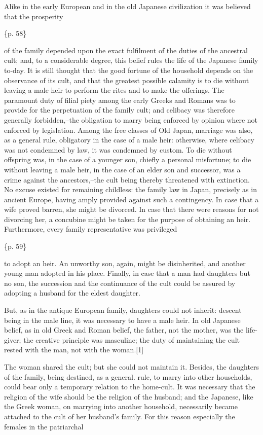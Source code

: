 Alike in the early European and in the old Japanese civilization it was believed that the prosperity

\{p. 58\}

of the family depended upon the exact fulfilment of the duties of the ancestral cult; and, to a considerable degree, this belief rules the life of the Japanese family to-day. It is still thought that the good fortune of the household depends on the observance of its cult, and that the greatest possible calamity is to die without leaving a male heir to perform the rites and to make the offerings. The paramount duty of filial piety among the early Greeks and Romans was to provide for the perpetuation of the family cult; and celibacy was therefore generally forbidden,--the obligation to marry being enforced by opinion where not enforced by legislation. Among the free classes of Old Japan, marriage was also, as a general rule, obligatory in the case of a male heir: otherwise, where celibacy was not condemned by law, it was condemned by custom. To die without offspring was, in the case of a younger son, chiefly a personal misfortune; to die without leaving a male heir, in the case of an elder son and successor, was a crime against the ancestors,--the cult being thereby threatened with extinction. No excuse existed for remaining childless: the family law in Japan, precisely as in ancient Europe, having amply provided against such a contingency. In case that a wife proved barren, she might be divorced. In case that there were reasons for not divorcing her, a concubine might be taken for the purpose of obtaining an heir. Furthermore, every family representative was privileged

\{p. 59\}

to adopt an heir. An unworthy son, again, might be disinherited, and another young man adopted in his place. Finally, in case that a man had daughters but no son, the succession and the continuance of the cult could be assured by adopting a husband for the eldest daughter.

But, as in the antique European family, daughters could not inherit: descent being in the male line, it was necessary to have a male heir. In old Japanese belief, as in old Greek and Roman belief, the father, not the mother, was the life-giver; the creative principle was masculine; the duty of maintaining the cult rested with the man, not with the woman.[1]

The woman shared the cult; but she could not maintain it. Besides, the daughters of the family, being destined, as a general. rule, to marry into other households, could bear only a temporary relation to the home-cult. It was necessary that the religion of the wife should be the religion of the husband; and the Japanese, like the Greek woman, on marrying into another household, necessarily became attached to the cult of her husband's family. For this reason especially the females in the patriarchal

